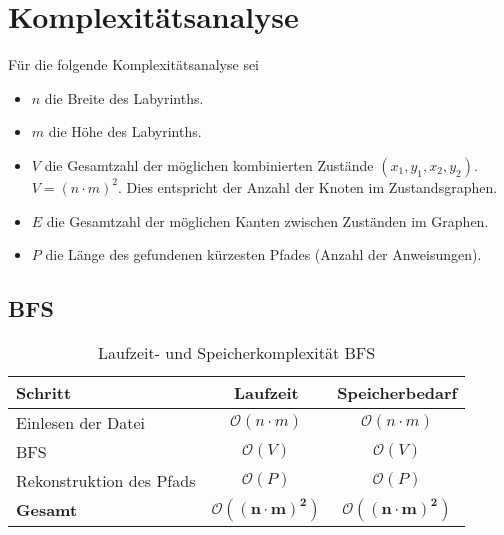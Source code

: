 \documentclass[a4paper,10pt,ngerman]{scrartcl}
\begin{document}
\section{Komplexitätsanalyse}
Für die folgende Komplexitätsanalyse sei
\begin{itemize}
    \item $n$ die Breite des Labyrinths.
    \item $m$ die Höhe des Labyrinths.
    \item $V$ die Gesamtzahl der möglichen kombinierten Zustände $(x_1, y_1, x_2, y_2)$. $V = (n \cdot m)^2$. Dies entspricht der Anzahl der Knoten im Zustandsgraphen.
    \item $E$ die Gesamtzahl der möglichen Kanten zwischen Zuständen im Graphen.
    \item $P$ die Länge des gefundenen kürzesten Pfades (Anzahl der Anweisungen).
\end{itemize}
\vspace{0.2cm}
\subsection{BFS}
\begin{table}[H]
\centering
\begin{tabular}{|l|c|c|}
\hline
\textbf{Schritt} & \textbf{Laufzeit} & \textbf{Speicherbedarf} \\
\hline
Einlesen der Datei & $\mathcal{O}(n\cdot m)$ & $\mathcal{O}(n\cdot m)$ \\
BFS & $\mathcal{O}(V)$ & $\mathcal{O}(V)$ \\
Rekonstruktion des Pfads & $\mathcal{O}(P)$ & $\mathcal{O}(P)$ \\
\hline
\textbf{Gesamt} & $\boldsymbol{\mathcal{O}((n\cdot m)^2)}$ & $\boldsymbol{\mathcal{O}((n\cdot m)^2)}$ \\
\hline
\end{tabular}
\caption{Laufzeit- und Speicherkomplexität BFS}
\end{table}
\end{document}
